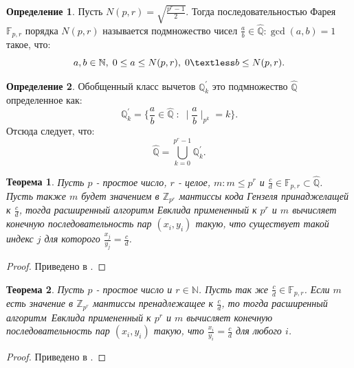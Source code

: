 \documentclass[master, och, diploma, times]{sty/SCWorks}
\theoremstyle{plain}
\newtheorem{thethm}{Теорема}[section]
\theoremstyle{definition}
\newtheorem{defn}{Определение}[section]
\numberwithin{equation}{section}
\begin{document}
\begin{defn}\label{def:farey}
Пусть $N(p, r)=\sqrt{\frac{p^r-1}{2}}$. Тогда последовательностью Фарея $\mathbb{F}_{p,r}$ порядка $N(p, r)$ называется подмножество чисел $\frac{a}{b} \in \hat{\mathbb{Q}}: \gcd{(a,b)}=1$ такое, что:
\begin{equation}
a, b \in \mathbb{N}, \; 0 \leq a \leq N(p, r), \; 0 \textless b \leq N(p, r).
\end{equation}
\end{defn}


\begin{defn}\label{def:qhat}
Обобщенный класс вычетов $\mathbb{Q}_k^{'}$ это подмножество $\hat{\mathbb{Q}}$ определенное как:
\begin{equation}
\mathbb{Q}_k^{'}=\bigg \{ \frac{a}{b} \in \hat{\mathbb{Q}} \; : \; \mid \frac{a}{b} \mid_{p^k}=k \bigg \}.
\end{equation}
Отсюда следует, что:
\begin{equation}
\hat{\mathbb{Q}} = \bigcup\limits_{k=0}^{p^r-1} \mathbb{Q}_k^{'}.
\end{equation}
\end{defn}


\begin{thethm}\label{th:backward_mapping}
Пусть $p$ - простое число, $r$ - целое, $m: m \leq p^r$ и $\frac{c}{d} \in \mathbb{F}_{p,r} \subset \hat{\mathbb{Q}}$. Пусть также $m$ будет значением в $\mathbb{Z}_{p^r}$ мантиссы кода Гензеля принаджелащей к $\frac{c}{d}$, тогда расширенный алгоритм Евклида примененный к $p^r$ и $m$ вычисляет конечную последовательность пар $(x_i, y_i)$ такую, что существует такой индекс $j$ для которого $\frac{x_j}{y_j}=\frac{c}{d}$.
\end{thethm}

\begin{proof} 
Приведено в \cite{bib:numbers:miola}.
\end{proof}

\begin{thethm}
Пусть $p$ - простое число и $r \in \mathbb{N}$. Пусть так же $\frac{c}{d} \in \mathbb{F}_{p,r}$. Если $m$ есть значение в $\mathbb{Z}_{p^r}$ мантиссы пренадлежащее к $\frac{c}{d}$, то тогда \mbox{расширенный} \mbox{алгоритм Евклида} примененный к $p^r$ и $m$ вычисляет конечную последовательность пар $(x_i, y_i)$ такую, что $\frac{x_i}{y_i}=\frac{c}{d}$ для любого $i$.
\end{thethm}

\begin{proof} 
Приведено в \cite{bib:numbers:miola}.
\end{proof}
\end{document}
